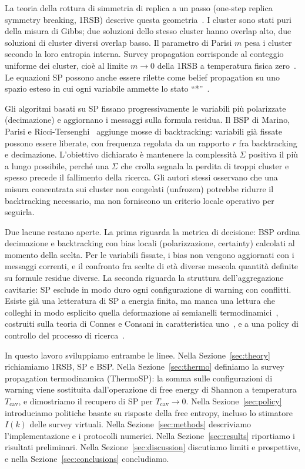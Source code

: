 \documentclass{article}
\newcommand{\Sig}{\Sigma}
\newcommand{\Tc}{T_{\mathrm{cav}}}
\begin{document}
La teoria della rottura di simmetria di replica a un passo (one-step replica symmetry breaking, 1RSB) descrive questa geometria~\cite{parisi1980sequence,mezard2001bethe}.
I cluster sono stati puri della misura di Gibbs; due soluzioni dello stesso cluster hanno overlap alto, due soluzioni di cluster diversi overlap basso.
Il parametro di Parisi $m$ pesa i cluster secondo la loro entropia interna.
Survey propagation corrisponde al conteggio uniforme dei cluster, cio\`e al limite $m\to 0$ della 1RSB a temperatura fisica zero~\cite{mezard2002analytic,braunstein2005survey}.
Le equazioni SP possono anche essere rilette come belief propagation su uno spazio esteso in cui ogni variabile ammette lo stato ``*''~\cite{braunstein2004surveybp}.

Gli algoritmi basati su SP fissano progressivamente le variabili pi\`u polarizzate (decimazione) e aggiornano i messaggi sulla formula residua.
Il BSP di Marino, Parisi e Ricci-Tersenghi~\cite{marino2016bsp} aggiunge mosse di backtracking: variabili gi\`a fissate possono essere liberate, con frequenza regolata da un rapporto $r$ fra backtracking e decimazione.
L'obiettivo dichiarato \`e mantenere la complessit\`a $\Sig$ positiva il pi\`u a lungo possibile, perch\'e una $\Sig$ che crolla segnala la perdita di troppi cluster e spesso precede il fallimento della ricerca.
Gli autori stessi osservano che una misura concentrata sui cluster non congelati (unfrozen) potrebbe ridurre il backtracking necessario, ma non forniscono un criterio locale operativo per seguirla.

Due lacune restano aperte.
La prima riguarda la metrica di decisione: BSP ordina decimazione e backtracking con bias locali (polarizzazione, certainty) calcolati al momento della scelta.
Per le variabili fissate, i bias non vengono aggiornati con i messaggi correnti, e il confronto fra scelte di et\`a diverse mescola quantit\`a definite su formule residue diverse.
La seconda riguarda la struttura dell'aggregazione cavitarie: SP esclude in modo duro ogni configurazione di warning con conflitti.
Esiste gi\`a una letteratura di SP a energia finita, ma manca una lettura che colleghi in modo esplicito quella deformazione ai semianelli termodinamici~\cite{marcolli2014thermodynamic}, costruiti sulla teoria di Connes e Consani in caratteristica uno~\cite{connes2010characteristic,connes2014witt}, e a una policy di controllo del processo di ricerca~\cite{kappen2005path}.

In questo lavoro sviluppiamo entrambe le linee.
Nella Sezione~\ref{sec:theory} richiamiamo 1RSB, SP e BSP.
Nella Sezione~\ref{sec:thermo} definiamo la survey propagation termodinamica (ThermoSP): la somma sulle configurazioni di warning viene sostituita dall'operazione di free energy di Shannon a temperatura $\Tc$, e dimostriamo il recupero di SP per $\Tc\to 0$.
Nella Sezione~\ref{sec:policy} introduciamo politiche basate su risposte della free entropy, incluso lo stimatore $I(k)$ delle survey virtuali.
Nella Sezione~\ref{sec:methods} descriviamo l'implementazione e i protocolli numerici.
Nella Sezione~\ref{sec:results} riportiamo i risultati preliminari.
Nella Sezione~\ref{sec:discussion} discutiamo limiti e prospettive, e nella Sezione~\ref{sec:conclusions} concludiamo.
\end{document}
